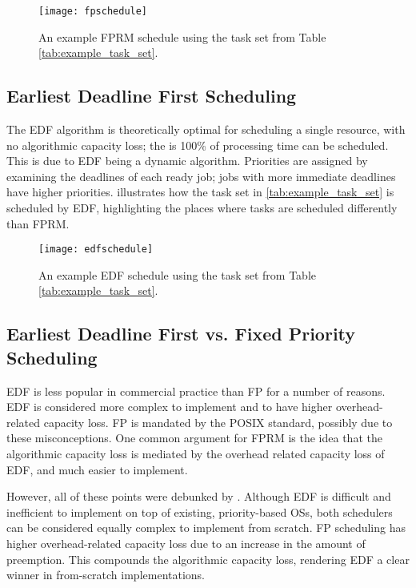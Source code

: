 \begin{figure}[h!tb]
	\begin{center}
		\leavevmode
		\texttt{[image: fpschedule]}
		\caption{An example FPRM schedule using the task set from Table \ref{tab:example_task_set}.}
		\label{fig:fp-schedule}
	\end{center}
\end{figure}

\subsection{Earliest Deadline First Scheduling}

The \gls{EDF} algorithm is theoretically optimal for scheduling a single resource, with no
algorithmic capacity loss; the is 100\% of processing time can be scheduled. This is due to
\gls{EDF} being a dynamic algorithm.
Priorities are assigned by examining the deadlines of each ready job; jobs with more immediate deadlines have higher priorities.
 illustrates how the task set in \cref{tab:example_task_set} is scheduled by
\gls{EDF}, highlighting the places where tasks are scheduled differently than FPRM.

\begin{figure}[h!tb]
	\begin{center}
		\leavevmode
		\texttt{[image: edfschedule]}
		\caption{An example EDF schedule using the task set from Table \ref{tab:example_task_set}.}
		\label{f:edf-schedule}
	\end{center}
\end{figure}

\subsection{Earliest Deadline First vs. Fixed Priority Scheduling}

\gls{EDF} is less popular in commercial practice than \gls{FP} for a number of reasons.  \gls{EDF}
is considered more complex to implement and to have higher overhead-related capacity loss.  \gls{FP}
is mandated by the POSIX standard, possibly due to these misconceptions. One common argument for
\gls{FPRM} is the idea that the algorithmic capacity loss is mediated by the overhead related
capacity loss of \gls{EDF}, and much easier to implement. 

However, all of these points were debunked by \citet{Buttazzo_05}.  Although \gls{EDF} is difficult
and inefficient to implement on top of existing, priority-based \glspl{OS}, both schedulers
can be considered equally complex to implement from scratch.  \gls{FP} scheduling has higher
overhead-related capacity loss due to an increase in the amount of preemption.  This compounds the
algorithmic capacity loss, rendering \gls{EDF} a clear winner in from-scratch implementations.

